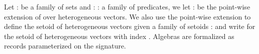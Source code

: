 Let  :    be a family of sets and
 : \AgdaSymbol{\{} : \AgdaSymbol{\}}   
  a
family of predicates, we let  \AgdaSymbol{*} :  \AgdaSymbol{\{}\AgdaSymbol{\}}
      be the
point-wise extension of  over heterogeneous vectors. We also use
the point-wise extension to define the setoid of heterogeneous vectors
given a family of setoids  :    and write
   for the
setoid of heterogeneous vectors with index . Algebras are
formalized as records parameterized on the signature.


\begin{code}
\>[0]\AgdaSpace{}%
\AgdaSpace{}%
\AgdaSymbol{(}\AgdaSpace{}%
\AgdaSymbol{:}\AgdaSpace{}%
\AgdaSymbol{)}\AgdaSpace{}%
\AgdaSymbol{:}\AgdaSpace{}%
\AgdaSpace{}%
\<%
\\
\>[0][@{}l@{\AgdaIndent{0}}]%
\>[2]\<%
\\
\>[2][@{}l@{\AgdaIndent{0}}]%
\>[4]%
\>[12]\AgdaSymbol{:}\AgdaSpace{}%
\AgdaSpace{}%
\AgdaSpace{}%
\AgdaSpace{}%
\AgdaSpace{}%
\\
%
\>[4]%
\>[13]\AgdaSymbol{:}\AgdaSpace{}%
\AgdaSpace{}%
\AgdaSymbol{\{}\AgdaSpace{}%
\AgdaSymbol{\}}\AgdaSpace{}%
\AgdaSpace{}%
\AgdaSpace{}%
\AgdaSpace{}%
\AgdaSymbol{(}\AgdaSpace{}%
\AgdaOperator{\AgdaInductiveConstructor{,}}\AgdaSpace{}%
\AgdaSymbol{)}\AgdaSpace{}%
\AgdaSpace{}%
\AgdaSpace{}%
\AgdaSpace{}%
\AgdaSpace{}%
\AgdaSpace{}%
\AgdaSpace{}%
\<%
\end{code}



